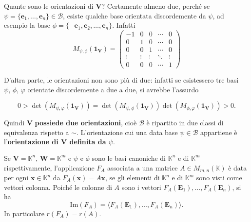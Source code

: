 \documentclass{article}
\theoremstyle{plain}
\theoremstyle{definition}
\theoremstyle{remark}
\begin{document}
\vspace{10pt}

Quante sono le orientazioni di $\mathbf{V}$? Certamente almeno due, perché se $\psi = \{\mathbf{e}_1, \ldots, \mathbf{e}_n\}\in\mathcal{B}$, 
esiste qualche base orientata discordemente da $\psi$, ad esempio la base $\phi = \{-\mathbf{e}_1, \mathbf{e}_2, \ldots, \mathbf{e}_n\}$. 
Infatti
\[
M_{\psi,\phi}(\mathbf{1_V}) = 
\begin{pmatrix}
-1 & 0 & 0 & \cdots & 0 \\
0 & 1 & 0 & \cdots & 0 \\
0 & 0 & 1 & \cdots & 0 \\
\vdots & \vdots & \vdots & \ddots & \vdots \\
0 & 0 & 0 & \cdots & 1
\end{pmatrix}
\]

D'altra parte, le orientazioni non sono più di due: infatti se esistessero tre basi $\psi,\,\phi,\,\varphi$ orientate discordemente a due a due, si avrebbe l'assurdo

\[
0 > \det(M_{\psi,\varphi}(\mathbf{1_V})) = \det(M_{\psi,\phi}(\mathbf{1_V})) \det(M_{\phi,\varphi}(\mathbf{1_V})) > 0.
\]

Quindi $\mathbf{V}$ \textbf{possiede due orientazioni}, cioè $\mathcal{B}$ è ripartito in due classi di equivalenza rispetto a $\sim$. 
L'orientazione cui una data base $\psi \in \mathcal{B}$ appartiene è l'\textbf{orientazione di $\mathbf{V}$ definita da $\psi$}.

\vspace{10pt}

Se $\mathbf{V} = \mathbb{K}^n$, $\mathbf{W} = \mathbb{K}^m$ e $\psi$ e $\phi$ sono le basi canoniche di $\mathbb{K}^n$ e di $\mathbb{K}^m$ rispettivamente, 
l'applicazione $F_A$ associata a una matrice $A \in M_{m,n}(\mathbb{K})$ è data per ogni $\mathbf{x} \in \mathbb{K}^n$ da $F_A(\mathbf{x}) = A\mathbf{x}$,
se gli elementi di $\mathbb{K}^n$ e di $\mathbb{K}^m$ sono visti come vettori colonna. 
Poiché le colonne di $A$ sono i vettori $F_A(\mathbf{E}_1),\ldots,F_A(\mathbf{E}_n)$, si ha
\[
\mathrm{Im}(F_A) = \langle F_A(\mathbf{E}_1),\ldots,F_A(\mathbf{E}_n) \rangle.
\]
In particolare $r(F_A) = r(A)$.
    
\vspace{10pt}
\end{document}
